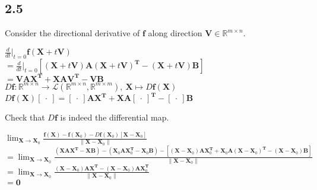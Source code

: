 \documentclass[12pt,a4paper,titlepage]{article}
\begin{document}
\subsection*{2.5}
Consider the directional derivative of $\mathbf{f}$ along direction $\mathbf{V}\in\mathbb{R}^{m\times n}$.\\
\begin{flushleft}
$ \frac{d}{dt}|_{t=0}\mathbf{f}(\mathbf{X}+t\mathbf{V})$\\ \vspace{1em}
$=\frac{d}{dt}|_{t=0}[(\mathbf{X}+t\mathbf{V})\mathbf{A}(\mathbf{X}+t\mathbf{V})^\mathbf{T}-(\mathbf{X}+t\mathbf{V})\mathbf{B}]$\\ \vspace{1em}
$ = \mathbf{VAX^T+XAV^T-VB}$\\ \vspace{2em}
$D\mathbf{f}:\mathbb{R}^{m\times n}\rightarrow 
\mathcal{L}(\mathbb{R}^{m\times n},\mathbb{R}^{m\times m}),\:\mathbf{X} \mapsto D\mathbf{f(X)}$ \\ \vspace{1em}
$D\mathbf{f(X)[\:\cdot\:]} = \mathbf{[\:\cdot\:]AX^T+XA[\:\cdot\:]^T-[\:\cdot\:]B}$
\end{flushleft}
Check that $D\mathbf{f}$ is indeed the differential map.\\
\begin{flushleft}
$\lim_{\mathbf{X}\to\mathbf{X}_0}\frac{\mathbf{f(X)}-\mathbf{f}(\mathbf{X}_0)-D\mathbf{f}(\mathbf{X}_0)[\mathbf{X}-\mathbf{X}_0]}{\|\mathbf{X}-\mathbf{X}_0\|}$\\ \vspace{1em}
$=\lim_{\mathbf{X}\to\mathbf{X}_0}\frac{\mathbf{(XAX^T-XB)}-(\mathbf{X}_0\mathbf{AX}_0^\mathbf{T}-\mathbf{X}_0\mathbf{B})-[(\mathbf{X-X}_0)\mathbf{AX}_0^\mathbf{T}+\mathbf{X}_0\mathbf{A}(\mathbf{X-X}_0)^\mathbf{T}-(\mathbf{X-X}_0)\mathbf{B}]}{\|\mathbf{X}-\mathbf{X}_0\|}$ \\ \vspace{1em}
$=\lim_{\mathbf{X}\to\mathbf{X}_0}\frac{(\mathbf{X-X}_0)\mathbf{AX^T}-(\mathbf{X-X}_0)\mathbf{AX}_0^\mathbf{T}}{\|\mathbf{X}-\mathbf{X}_0\|}$ \\ \vspace{1em}
$=\mathbf{0}$ \\ \vspace{1em}
\end{flushleft}
\end{document}
